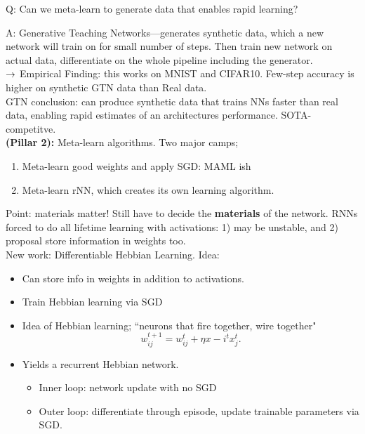 Q: Can we meta-learn to generate data that enables rapid learning?

A: Generative Teaching Networks---generates synthetic data, which a new network will train on for small number of steps. Then train new network on actual data, differentiate on the whole pipeline including the generator. \\

$\rightarrow$ Empirical Finding: this works on MNIST and CIFAR10. Few-step accuracy is higher on synthetic GTN data than Real data. \\

GTN conclusion: can produce synthetic data that trains NNs faster than real data, enabling rapid estimates of an architectures performance. SOTA-competitve. \\

{\bf (Pillar 2):} Meta-learn algorithms. Two major camps;
\begin{enumerate}
    \item Meta-learn good weights and apply SGD: MAML ish
    \item Meta-learn rNN, which creates its own learning algorithm.
\end{enumerate}

Point: materials matter! Still have to decide the {\bf materials} of the network. RNNs forced to do all lifetime learning with activations: 1) may be unstable, and 2) proposal store information in weights too. \\

New work: Differentiable Hebbian Learning. Idea:
\begin{itemize}
    \item Can store info in weights in addition to activations.
    
    \item Train Hebbian learning via SGD
    
    \item Idea of Hebbian learning; ``neurons that fire together, wire together"
    \[
    w_{ij}^{t+1} = w_{ij}^t + \eta x-i^t x_j^t.
    \]
    \item Yields a recurrent Hebbian network.
    
    \begin{itemize}
        \item Inner loop: network update with no SGD
        \item Outer loop: differentiate through episode, update trainable parameters via SGD.
    \end{itemize}
\end{itemize}

